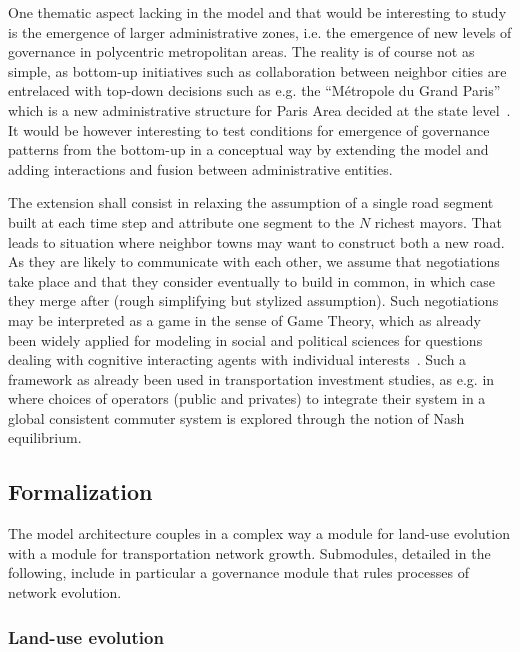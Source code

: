 One thematic aspect lacking in the model and that would be interesting to study is the emergence of larger administrative zones, i.e. the emergence of new levels of governance in polycentric metropolitan areas. The reality is of course not as simple, as bottom-up initiatives such as collaboration between neighbor cities are entrelaced with top-down decisions such as e.g. the ``M{\'e}tropole du Grand Paris'' which is a new administrative structure for Paris Area decided at the state level~\cite{gilli2009paris}. It would be however interesting to test conditions for emergence of governance patterns from the bottom-up in a conceptual way by extending the model and adding interactions and fusion between administrative entities.

The extension shall consist in relaxing the assumption of a single road segment built at each time step and attribute one segment to the $N$ richest mayors. That leads to situation where neighbor towns may want to construct both a new road. As they are likely to communicate with each other, we assume that negotiations take place and that they consider eventually to build in common, in which case they merge after (rough simplifying but stylized assumption). Such negotiations may be interpreted as a game in the sense of Game Theory, which as already been widely applied for modeling in social and political sciences for questions dealing with cognitive interacting agents with individual interests~\cite{ordeshook1986game}. Such a framework as already been used in transportation investment studies, as e.g. in~\cite{Roumboutsos2008209} where choices of operators (public and privates) to integrate their system in a global consistent commuter system is explored through the notion of Nash equilibrium.




\subsection{Formalization}


The model architecture couples in a complex way a module for land-use evolution with a module for transportation network growth. Submodules, detailed in the following, include in particular a governance module that rules processes of network evolution.


\subsubsection{Land-use evolution}




